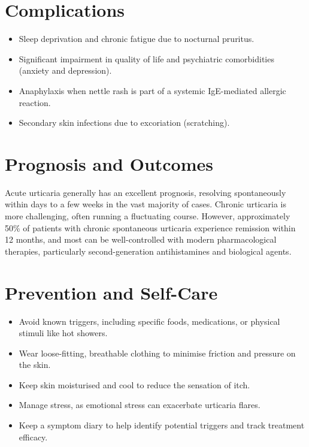 \section*{Complications}
\begin{itemize}
    \item Sleep deprivation and chronic fatigue due to nocturnal pruritus.
    \item Significant impairment in quality of life and psychiatric comorbidities (anxiety and depression).
    \item Anaphylaxis when nettle rash is part of a systemic IgE-mediated allergic reaction.
    \item Secondary skin infections due to excoriation (scratching).
\end{itemize}

\section*{Prognosis and Outcomes}
Acute urticaria generally has an excellent prognosis, resolving spontaneously within days to a few weeks in the vast majority of cases. Chronic urticaria is more challenging, often running a fluctuating course. However, approximately 50\% of patients with chronic spontaneous urticaria experience remission within 12 months, and most can be well-controlled with modern pharmacological therapies, particularly second-generation antihistamines and biological agents.

\section*{Prevention and Self-Care}
\begin{itemize}
    \item Avoid known triggers, including specific foods, medications, or physical stimuli like hot showers.
    \item Wear loose-fitting, breathable clothing to minimise friction and pressure on the skin.
    \item Keep skin moisturised and cool to reduce the sensation of itch.
    \item Manage stress, as emotional stress can exacerbate urticaria flares.
    \item Keep a symptom diary to help identify potential triggers and track treatment efficacy.
\end{itemize}

